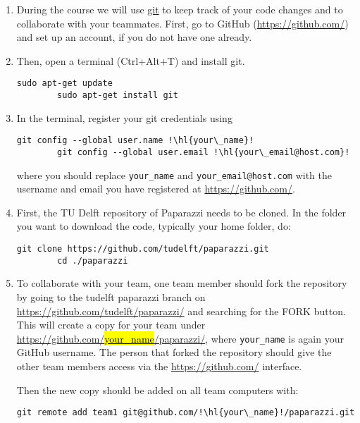 \begin{enumerate}
	
	\item During the course we will use \href{https://git-scm.com/}{git} to keep track of your code changes and to collaborate with your teammates. First, go to GitHub (\url{https://github.com/}) and set up an account, if you do not have one already. 
	
	\item Then, open a terminal (Ctrl+Alt+T) and install git. 
	
	\begin{lstlisting}[style=Bash]
		sudo apt-get update
		sudo apt-get install git
	\end{lstlisting}

	\item In the terminal, register your git credentials using
	\begin{lstlisting}[style=Bash]
		git config --global user.name !\hl{your\_name}!
		git config --global user.email !\hl{your\_email@host.com}!
	\end{lstlisting}
	where you should replace \texttt{your\_name} and \texttt{your\_email@host.com} with the username and email you have registered at \url{https://github.com/}.

	\item First, the TU Delft repository of Paparazzi needs to be cloned. In the folder you want to download the code, typically your home folder, do:

	\begin{lstlisting}[style=Bash]
		git clone https://github.com/tudelft/paparazzi.git
		cd ./paparazzi
	\end{lstlisting}

	\item To collaborate with your team, one team member should fork the repository by going to the tudelft paparazzi branch on \href{https://github.com/tudelft/paparazzi/}{https://github.com/tudelft/paparazzi/} and searching for the FORK button. This will create a copy for your team under \href{https://github.com/your_name/paparazzi/}{https://github.com/\hl{your\_name}/paparazzi/}, where \texttt{your\_name} is again your GitHub username. The person that forked the repository should give the other team members access via the \url{https://github.com/} interface.

	Then the new copy should be added on all team computers with:
	\begin{lstlisting}[style=Bash]
		git remote add team1 git@github.com/!\hl{your\_name}!/paparazzi.git
	\end{lstlisting}


\end{enumerate}
